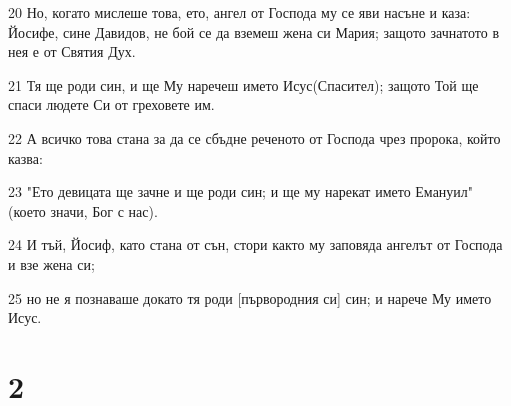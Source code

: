 \par 20 Но, когато мислеше това, ето, ангел от Господа му се яви насъне и каза: Йосифе, сине Давидов, не бой се да вземеш жена си Мария; защото зачнатото в нея е от Святия Дух.
\par 21 Тя ще роди син, и ще Му наречеш името Исус(Спасител); защото Той ще спаси людете Си от греховете им.
\par 22 А всичко това стана за да се сбъдне реченото от Господа чрез пророка, който казва:
\par 23 "Ето девицата ще зачне и ще роди син; и ще му нарекат името Емануил" (което значи, Бог с нас).
\par 24 И тъй, Йосиф, като стана от сън, стори както му заповяда ангелът от Господа и взе жена си;
\par 25 но не я познаваше докато тя роди [първородния си] син; и нарече Му името Исус.

\chapter{2}

